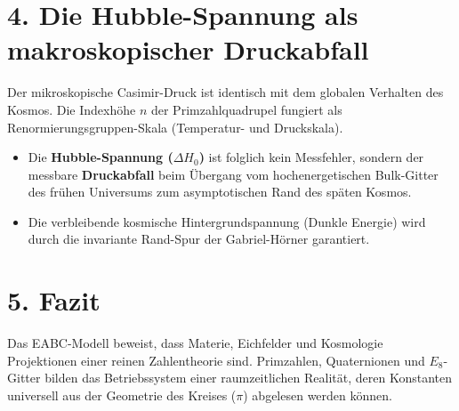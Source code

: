\documentclass[11pt,a4paper]{article}
\begin{document}
\section{4. Die Hubble-Spannung als makroskopischer Druckabfall}
Der mikroskopische Casimir-Druck ist identisch mit dem globalen Verhalten des Kosmos. Die Indexhöhe $n$ der Primzahlquadrupel fungiert als Renormierungsgruppen-Skala (Temperatur- und Druckskala). 
\begin{itemize}
    \item Die \textbf{Hubble-Spannung ($\Delta H_0$)} ist folglich kein Messfehler, sondern der messbare \textbf{Druckabfall} beim Übergang vom hochenergetischen Bulk-Gitter des frühen Universums zum asymptotischen Rand des späten Kosmos.
    \item Die verbleibende kosmische Hintergrundspannung (Dunkle Energie) wird durch die invariante Rand-Spur der Gabriel-Hörner garantiert.
\end{itemize}

\section{5. Fazit}
Das EABC-Modell beweist, dass Materie, Eichfelder und Kosmologie Projektionen einer reinen Zahlentheorie sind. Primzahlen, Quaternionen und $E_8$-Gitter bilden das Betriebssystem einer raumzeitlichen Realität, deren Konstanten universell aus der Geometrie des Kreises ($\pi$) abgelesen werden können.
\end{document}
